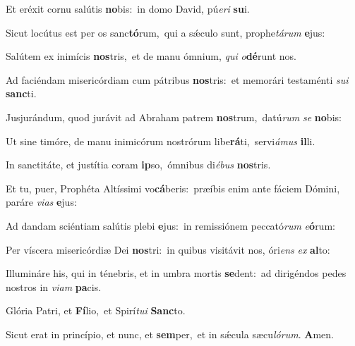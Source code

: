 
\vs Et eréxit cornu salútis \textbf{no}bis:~\redgreheightstar in domo David, pú\textit{e}\textit{ri} \textbf{su}i.

\vs Sicut locútus est per os sanc\textbf{tó}rum,~\redgreheightstar qui a sǽculo sunt, prophe\textit{tá}\textit{rum} \textbf{e}jus:

\vs Salútem ex inimícis \textbf{nos}tris,~\redgreheightstar et de manu ómnium, \textit{qui} \textit{o}\textbf{dé}runt nos.

\vs Ad faciéndam misericórdiam cum pátribus \textbf{nos}tris:~\redgreheightstar et memorári testaménti \textit{su}\textit{i} \textbf{sanc}ti.

\vs Jusjurándum, quod jurávit ad Abraham patrem \textbf{nos}trum,~\redgreheightstar datú\textit{rum} \textit{se} \textbf{no}bis:

\vs Ut sine timóre, de manu inimicórum nostrórum libe\textbf{rá}ti,~\redgreheightstar servi\textit{á}\textit{mus} \textbf{il}li.

\vs In sanctitáte, et justítia coram \textbf{ip}so,~\redgreheightstar ómnibus di\textit{é}\textit{bus} \textbf{nos}tris.

\vs Et tu, puer, Prophéta Altíssimi vo\textbf{cá}beris:~\redgreheightstar præíbis enim ante fáciem Dómini, paráre \textit{vi}\textit{as} \textbf{e}jus:

\vs Ad dandam sciéntiam salútis plebi \textbf{e}jus:~\redgreheightstar in remissiónem peccató\textit{rum} \textit{e}\textbf{ó}rum:

\vs Per víscera misericórdiæ Dei \textbf{nos}tri:~\redgreheightstar in quibus visitávit nos, óri\textit{ens} \textit{ex} \textbf{al}to:

\vs Illumináre his, qui in ténebris, et in umbra mortis \textbf{se}dent:~\redgreheightstar ad dirigéndos pedes nostros in \textit{vi}\textit{am} \textbf{pa}cis.

\vs Glória Patri, et \textbf{Fí}lio,~\redgreheightstar et Spirí\textit{tu}\textit{i} \textbf{Sanc}to.

\vs Sicut erat in princípio, et nunc, et \textbf{sem}per,~\redgreheightstar et in sǽcula sæcu\textit{ló}\textit{rum}. \textbf{A}men.

